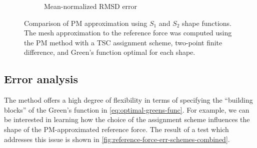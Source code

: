 \begin{figure}[htp]
\begin{subfigure}[b]{0.48\textwidth}
        \caption{Mean-normalized RMSD error}
        \label{fig:reference-force-error-sub}
    \end{subfigure}
    \caption{Comparison of PM approximation using $S_1$ and $S_2$ shape functions.
        The mesh approximation to the reference force was computed using the PM method with a TSC assignment scheme, two-point finite difference, and Green's function optimal for each shape.
    }
    \label{fig:reference-force-combined}
\end{figure}

\subsection{Error analysis}
The \PThreeM{} method offers a high degree of flexibility in terms of specifying the ``building blocks'' of the Green's function in \autoref{eq:optimal-greens-func}.
For example, we can be interested in learning how the choice of the assignment scheme influences the shape of the PM-approximated reference force.
The result of a test which addresses this issue is shown in \autoref{fig:reference-force-err-schemes-combined}.
